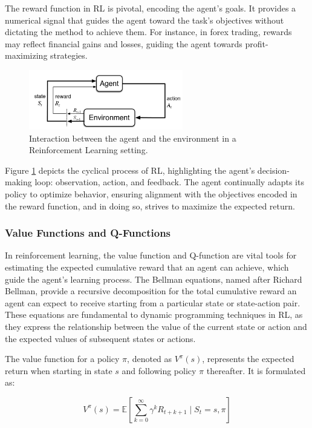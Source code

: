 The reward function in RL is pivotal, encoding the agent's goals. It provides a numerical signal that guides the agent toward the task's objectives without dictating the method to achieve them. For instance, in forex trading, rewards may reflect financial gains and losses, guiding the agent towards profit-maximizing strategies.

\begin{figure}[htb!]
\centering
\includegraphics[width=0.6\textwidth]{Images/AgentEnvironment.png}
\caption{Interaction between the agent and the environment in a Reinforcement Learning setting.}
\label{Figure:AgentEnvironment}
\end{figure}

Figure \ref{Figure:AgentEnvironment} depicts the cyclical process of RL, highlighting the agent's decision-making loop: observation, action, and feedback. The agent continually adapts its policy to optimize behavior, ensuring alignment with the objectives encoded in the reward function, and in doing so, strives to maximize the expected return.

\subsubsection{Value Functions and Q-Functions}

In reinforcement learning, the value function and Q-function are vital tools for estimating the expected cumulative reward that an agent can achieve, which guide the agent's learning process. The Bellman equations, named after Richard Bellman, provide a recursive decomposition for the total cumulative reward an agent can expect to receive starting from a particular state or state-action pair. These equations are fundamental to dynamic programming techniques in RL, as they express the relationship between the value of the current state or action and the expected values of subsequent states or actions.

The value function for a policy \( \pi \), denoted as \( V^\pi(s) \), represents the expected return when starting in state \( s \) and following policy \( \pi \) thereafter. It is formulated as:

\begin{equation}
V^\pi(s) = \mathbb{E} \left[ \sum_{k=0}^{\infty} \gamma^k R_{t+k+1} \mid S_t = s, \pi \right]
\end{equation}

